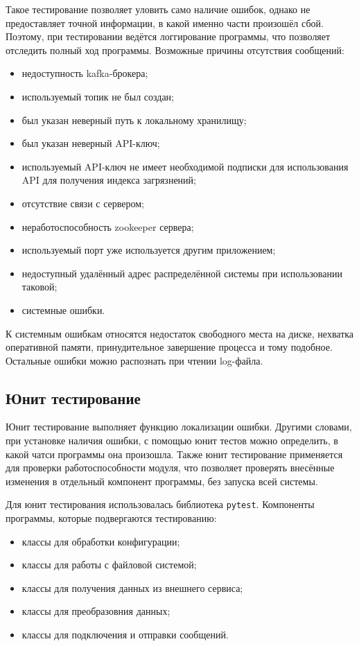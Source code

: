 Такое тестирование позволяет уловить само наличие ошибок, однако не предоставляет точной информации, в какой именно части произошёл сбой.
Поэтому, при тестировании ведётся логгирование программы, что позволяет отследить полный ход программы.
Возможные причины отсутствия сообщений:
\begin{itemize}
    \item недоступность kafka-брокера;
    \item используемый топик не был создан;
    \item был указан неверный путь к локальному хранилищу;
    \item был указан неверный API-ключ;
    \item используемый API-ключ не имеет необходимой подписки для использования API для получения индекса загрязнений;
    \item отсутствие связи с сервером;
    \item неработоспособность zookeeper сервера;
    \item используемый порт уже используется другим приложением;
    \item недоступный удалённый адрес распределённой системы при использовании таковой;
    \item системные ошибки.
\end{itemize}

К системным ошибкам относятся недостаток свободного места на диске, нехватка оперативной памяти, принудительное завершение процесса и тому подобное.
Остальные ошибки можно распознать при чтении log-файла.


\subsection{Юнит тестирование}
Юнит тестирование выполняет функцию локализации ошибки.
Другими словами, при установке наличия ошибки, с помощью юнит тестов можно определить, в какой чатси программы она произошла.
Также юнит тестирование применяется для проверки работоспособности модуля, что позволяет проверять внесённые изменения в отдельный компонент программы, без запуска всей системы.

Для юнит тестирования использовалась библиотека \texttt{pytest}.
Компоненты программы, которые подвергаются тестированию:
\begin{itemize}
    \item классы для обработки конфигурации;
    \item классы для работы с файловой системой;
    \item классы для получения данных из внешнего сервиса;
    \item классы для преобразовния данных;
    \item классы для подключения и отправки сообщений.
\end{itemize}

